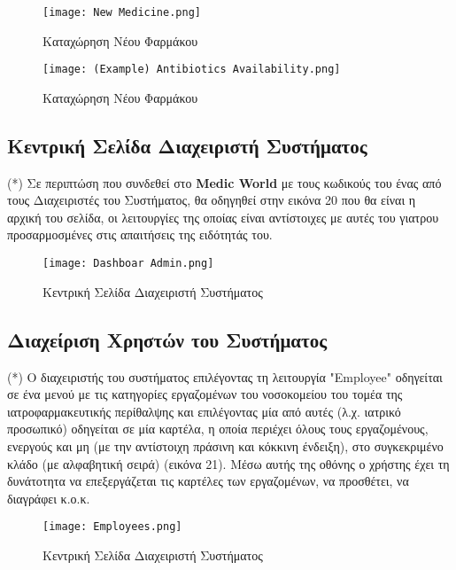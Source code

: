 \documentclass{article}
\begin{document}
\newpage

\begin{figure}[!htb]
\centering
\texttt{[image: New Medicine.png]} 
\caption{\label{fig:new medicine} Καταχώρηση Νέου Φαρμάκου}
\end{figure}

\vspace{0.3cm}

\begin{figure}[!htb]
\centering
\texttt{[image: (Example) Antibiotics Availability.png]} 
\caption{\label{fig:antibiotics} Καταχώρηση Νέου Φαρμάκου}
\end{figure}

\subsection{Κεντρική Σελίδα Διαχειριστή Συστήματος}
(*) Σε περιπτώση που συνδεθεί στο \textbf{Medic World} με τους κωδικούς του ένας από τους Διαχειριστές του Συστήματος, θα οδηγηθεί στην εικόνα 20 που θα είναι η αρχική του σελίδα, οι λειτουργίες της οποίας είναι αντίστοιχες με αυτές του γιατρου προσαρμοσμένες στις απαιτήσεις της ειδότητάς του.

\newpage

\begin{figure}[!htb]
\centering
\texttt{[image: Dashboar Admin.png]} 
\caption{\label{fig:dashboard admin} Κεντρική Σελίδα Διαχειριστή Συστήματος}
\end{figure}

\subsection{Διαχείριση Χρηστών του Συστήματος}

(*) Ο διαχειριστής του συστήματος επιλέγοντας τη λειτουργία "Employee" οδηγείται σε ένα μενού με τις κατηγορίες εργαζομένων του νοσοκομείου του τομέα της ιατροφαρμακευτικής περίθαλψης και επιλέγοντας μία από αυτές (λ.χ. ιατρικό προσωπικό) οδηγείται σε μία καρτέλα, η οποία περιέχει όλους τους εργαζομένους, ενεργούς και μη (με την αντίστοιχη πράσινη και κόκκινη ένδειξη), στο συγκεκριμένο κλάδο (με αλφαβητική σειρά) (εικόνα 21). Μέσω αυτής της οθόνης ο χρήστης έχει τη δυνάτοτητα να επεξεργάζεται τις καρτέλες των εργαζομένων, να προσθέτει, να διαγράφει κ.ο.κ.

\vspace{0.3cm}

\begin{figure}[!htb]
\centering
\texttt{[image: Employees.png]} 
\caption{\label{fig:main page (admin)} Κεντρική Σελίδα Διαχειριστή Συστήματος}
\end{figure}
\end{document}
